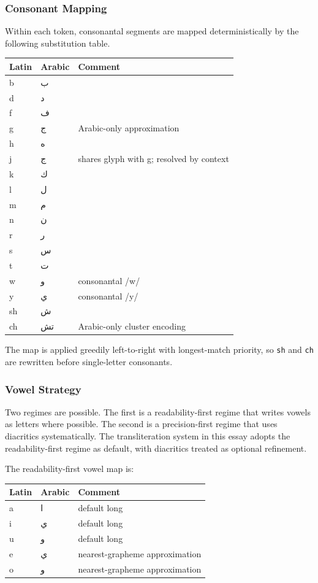 \documentclass[12pt]{article}
\begin{document}
\subsubsection{Consonant Mapping}

Within each token, consonantal segments are mapped deterministically by the following substitution table.

\begin{center}
\begin{tabular}{lll}
Latin & Arabic & Comment \\
\hline
b & ب & \\
d & د & \\
f & ف & \\
g & ج & Arabic-only approximation \\
h & ه & \\
j & ج & shares glyph with g; resolved by context \\
k & ك & \\
l & ل & \\
m & م & \\
n & ن & \\
r & ر & \\
s & س & \\
t & ت & \\
w & و & consonantal /w/ \\
y & ي & consonantal /y/ \\
sh & ش & \\
ch & تش & Arabic-only cluster encoding \\
\end{tabular}
\end{center}

The map is applied greedily left-to-right with longest-match priority, so \texttt{sh} and \texttt{ch} are rewritten before single-letter consonants.

\subsubsection{Vowel Strategy}

Two regimes are possible. The first is a readability-first regime that writes vowels as letters where possible. The second is a precision-first regime that uses diacritics systematically. The transliteration system in this essay adopts the readability-first regime as default, with diacritics treated as optional refinement.

The readability-first vowel map is:

\begin{center}
\begin{tabular}{lll}
Latin & Arabic & Comment \\
\hline
a & ا & default long \\
i & ي & default long \\
u & و & default long \\
e & ي & nearest-grapheme approximation \\
o & و & nearest-grapheme approximation \\
\end{tabular}
\end{center}
\end{document}
